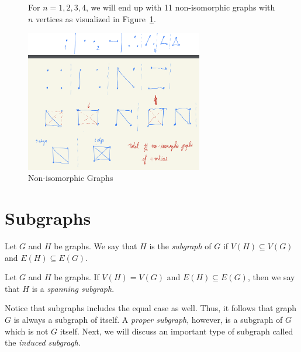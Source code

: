 \begin{figure}
\begin{nexample}
  For \(n = 1, 2, 3, 4\), we will end up with 11 non-isomorphic graphs with \(n\) vertices as visualized in Figure~\ref{fig:non-isomorphic-graphs}.

    \begin{center}
      \includegraphics[width=0.69\textwidth]{figures/l01/non-isomorphic-graphs}
    \end{center}
    \caption{Non-isomorphic Graphs}\label{fig:non-isomorphic-graphs}
\end{nexample}
\end{figure}

\section{Subgraphs}

\begin{definition}[Subgraph]
  Let \(G\) and \(H\) be graphs. We say that \(H\) is the \textit{subgraph} of
  \(G\) if \(V(H) \subseteq V(G)\) and \(E(H) \subseteq E(G)\).
\end{definition}

\begin{definition}
  Let \(G\) and \(H\) be graphs. If \(V(H) = V(G)\) and \(E(H) \subseteq E(G)\), then we say that \(H\) is a \textit{spanning subgraph}.
\end{definition}

Notice that subgraphs includes the equal case as well. Thus, it follows that graph \(G\) is always a subgraph of itself. A \textit{proper subgraph},
however, is a subgraph of \(G\) which is not \(G\) itself. Next, we will discuss
an important type of
subgraph called the \textit{induced subgragh}.

